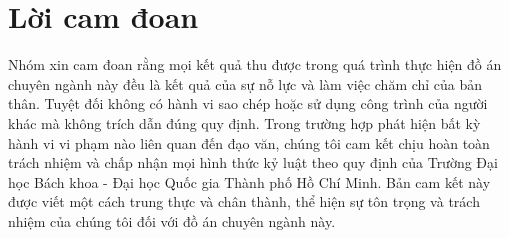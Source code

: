 \section*{Lời cam đoan}
\thispagestyle{empty}

\hspace*{0.5cm} Nhóm xin cam đoan rằng mọi kết quả thu được trong quá trình thực hiện đồ án chuyên ngành này đều là kết quả của sự nỗ lực và làm việc chăm chỉ của bản thân. Tuyệt đối không có hành vi sao chép hoặc sử dụng công trình của người khác mà không trích dẫn đúng quy định. Trong trường hợp phát hiện bất kỳ hành vi vi phạm nào liên quan đến đạo văn, chúng tôi cam kết chịu hoàn toàn trách nhiệm và chấp nhận mọi hình thức kỷ luật theo quy định của Trường Đại học Bách khoa - Đại học Quốc gia Thành phố Hồ Chí Minh. Bản cam kết này được viết một cách trung thực và chân thành, thể hiện sự tôn trọng và trách nhiệm của chúng tôi đối với đồ án chuyên ngành này.

\clearpage
{}
